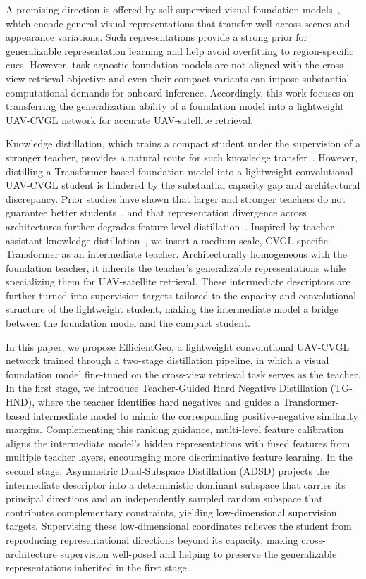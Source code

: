 A promising direction is offered by self-supervised visual foundation models~\cite{caron2021dino,simeoni2025dinov3}, which encode general visual representations that transfer well across scenes and appearance variations. 
Such representations provide a strong prior for generalizable representation learning and help avoid overfitting to region-specific cues. 
However, task-agnostic foundation models are not aligned with the cross-view retrieval objective and even their compact variants can impose substantial computational demands for onboard inference.
Accordingly, this work focuses on transferring the generalization ability of a foundation model into a lightweight UAV-CVGL network for accurate UAV-satellite retrieval.

Knowledge distillation, which trains a compact student under the supervision of a stronger teacher, provides a natural route for such knowledge transfer~\cite{hinton2015distilling}. However, distilling a Transformer-based foundation model into a lightweight convolutional UAV-CVGL student is hindered by the substantial capacity gap and architectural discrepancy. 
Prior studies have shown that larger and stronger teachers do not guarantee better students~\cite{cho2019efficacy}, and that representation divergence across architectures further degrades feature-level distillation~\cite{liu2022crossarchitecture,hao2023ofa}.
Inspired by teacher assistant knowledge distillation~\cite{mirzadeh2020takd}, we insert a medium-scale, CVGL-specific Transformer as an intermediate teacher.
Architecturally homogeneous with the foundation teacher, it inherits the teacher's generalizable representations while specializing them for UAV-satellite retrieval. 
These intermediate descriptors are further turned into supervision targets tailored to the capacity and convolutional structure of the lightweight student, making the intermediate model a bridge between the foundation model and the compact student. 

In this paper, we propose EfficientGeo, a lightweight convolutional UAV-CVGL network trained through a two-stage distillation pipeline, in which a visual foundation model fine-tuned on the cross-view retrieval task serves as the teacher. 
In the first stage, we introduce Teacher-Guided Hard Negative Distillation (TG-HND), where the teacher identifies hard negatives and guides a Transformer-based intermediate model to mimic the corresponding positive-negative similarity margins.
Complementing this ranking guidance, multi-level feature calibration aligns the intermediate model’s hidden representations with fused features from multiple teacher layers, encouraging more discriminative feature learning.
In the second stage, Asymmetric Dual-Subspace Distillation (ADSD) projects the intermediate descriptor into a deterministic dominant subspace that carries its principal directions and an independently sampled random subspace that contributes complementary constraints, yielding low-dimensional supervision targets. Supervising these low-dimensional coordinates relieves the student from reproducing representational directions beyond its capacity, making cross-architecture supervision well-posed and helping to preserve the generalizable representations inherited in the first stage.

